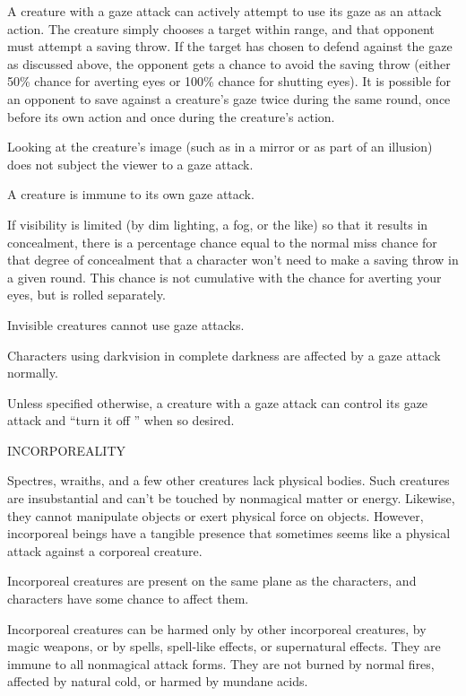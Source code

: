\documentclass{article}
\begin{document}
A creature with a gaze attack can actively attempt to use its gaze as an attack 
action. The creature simply chooses a target within range, and that opponent must 
attempt a saving throw. If the target has chosen to defend against the gaze as 
discussed above, the opponent gets a chance to avoid the saving throw (either 50\% 
chance for averting eyes or 100\% chance for shutting eyes). It is possible for 
an opponent to save against a creature's gaze twice during the same round, once 
before its own action and once during the creature's action.

Looking at the creature's image (such as in a mirror or as part of an illusion) 
does not subject the viewer to a gaze attack.

A creature is immune to its own gaze attack.

If visibility is limited (by dim lighting, a fog, or the like) so that it results 
in concealment, there is a percentage chance equal to the normal miss chance for 
that degree of concealment that a character won't need to make a saving throw in 
a given round. This chance is not cumulative with the chance for averting your 
eyes, but is rolled separately.

Invisible creatures cannot use gaze attacks.

Characters using darkvision in complete darkness are affected by a gaze attack 
normally.

Unless specified otherwise, a creature with a gaze attack can control its gaze 
attack and ``turn it off '' when so desired.

\vspace{12pt}
INCORPOREALITY

Spectres, wraiths, and a few other creatures lack physical bodies. Such creatures 
are insubstantial and can't be touched by nonmagical matter or energy. Likewise, 
they cannot manipulate objects or exert physical force on objects. However, incorporeal 
beings have a tangible presence that sometimes seems like a physical attack against 
a corporeal creature. 

Incorporeal creatures are present on the same plane as the characters, and characters 
have some chance to affect them. 

Incorporeal creatures can be harmed only by other incorporeal creatures, by magic 
weapons, or by spells, spell-like effects, or supernatural effects. They are immune 
to all nonmagical attack forms. They are not burned by normal fires, affected by 
natural cold, or harmed by mundane acids.
\end{document}
